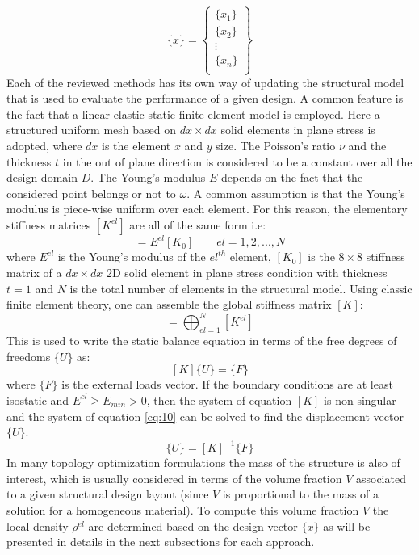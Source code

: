 \begin{equation}
     \lbrace x\rbrace=\left\lbrace\begin{array}{c}
          \lbrace x_1\rbrace  \\
           \lbrace x_2\rbrace  \\
           \vdots  \\
           \lbrace x_n\rbrace  \\
     \end{array}\right\rbrace
\end{equation}
Each of the reviewed methods has its own way of updating the structural model that is used to evaluate the performance of a given design. A common feature is the fact that a linear elastic-static finite element model is employed. Here a structured uniform mesh based on $dx\times dx$ solid elements in plane stress is adopted, where $dx$ is the element $x$ and $y$ size. The Poisson's ratio $\nu$ and the thickness $t$ in the out of plane direction is considered to be a constant over all the design domain $D$. The Young's modulus $E$ depends on the fact that the considered point belongs or not to $\omega$.  
A common assumption is that the Young's modulus is piece-wise uniform over each element.
For this reason, the elementary stiffness matrices $[{K}^{el}]$ are all of the same form i.e:
\begin{equation}
    [{K}^{el}]=E^{el}[{K}_0] \quad \quad  el=1,2,...,N
\end{equation}
where $E^{el}$ is the Young's modulus of the $el^{th}$ element, $[{K}_0]$ is the $8 \times 8$ stiffness matrix of a $dx\times dx$ 2D solid element in plane stress condition with thickness $t=1$ and $N$ is the total number of elements in the structural model.  
Using classic finite element theory, one can assemble the global stiffness matrix $[{K}]$:
\begin{equation}
    [{K}]=\bigoplus_{el=1}^{N} [{K}^{el}]
\end{equation}
This is used to write the static balance equation in terms of the free degrees of freedoms $\lbrace{U}\rbrace$ as:
\begin{equation}
\label{eq:10}
    [{K}]\lbrace{U}\rbrace=\lbrace{F}\rbrace
\end{equation}
where $\lbrace{F}\rbrace$ is the external loads vector. If the boundary conditions are at least isostatic and $ E^{el}\geq E_{min}>0$, then the system of equation  $[{K}]$ is non-singular and the system of equation \eqref{eq:10} can be solved to find the displacement vector $\lbrace{U}\rbrace$.
\begin{equation}
    \lbrace{U}\rbrace=[{K}]^{-1}\lbrace{F}\rbrace
\end{equation}
In many topology optimization formulations the mass of the structure is also of interest, which is usually considered in terms of the volume fraction $V$ associated to a given structural design layout (since $V$ is proportional to the mass of a solution for a homogeneous material). To compute this volume fraction $V$ the local density $\rho^{el}$ are determined based on the design vector $\lbrace {x}\rbrace$ as will be presented in details in the next subsections for each approach.

